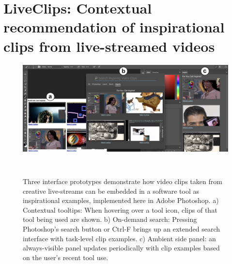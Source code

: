 



\chapter{LiveClips: Contextual recommendation of inspirational clips from live-streamed videos}

\begin{figure}[b!]
\centering
  \includegraphics[width=\textwidth]{liveclips/figures/all_interfaces.png}
  \caption{Three interface prototypes demonstrate how video clips taken from creative live-streams can be embedded in a software tool as inspirational examples, implemented here in Adobe Photoshop. a) Contextual tooltips: When hovering over a tool icon, clips of that tool being used are shown. b) On-demand search: Pressing Photoshop's search button or Ctrl-F brings up an extended search interface with task-level clip examples. c) Ambient side panel: an always-visible panel updates periodically with clip examples based on the user's recent tool use. }~\label{fig:liveclips_photoshop}
\end{figure}


